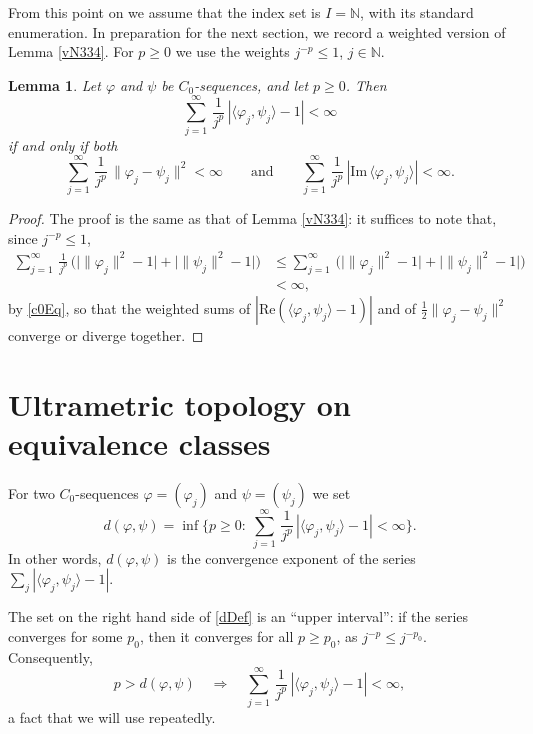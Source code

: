 \documentclass[twoside,11pt,letter]{article}
\def\bN{\mathbb{N}}
\def\im{\mathrm{Im}}
\def\re{\mathrm{Re}}
\theoremstyle{definition}
\theoremstyle{definition}
\theoremstyle{plain}
\newtheorem{lemma}[theorem]{Lemma}
\newenvironment{remark}[1][Remark.]{\begin{trivlist}
\item[\hskip \labelsep {\bfseries #1}]}{\end{trivlist}}
\begin{document}
From this point on we assume that the index set is $I=\bN$, with its standard enumeration. In preparation for the next section, we record a weighted version of Lemma \ref{vN334}. For $p\geq 0$ we use the weights $j^{-p}\leq 1$, $j\in\bN$.

\begin{lemma}\label{transferLem}
Let $\varphi$ and $\psi$ be $C_0$-sequences, and let $p\geq 0$. Then
\begin{equation*}
\sum_{j=1}^\infty\,\frac{1}{j^p}\,|\langle\varphi_j,\psi_j\rangle-1|<\infty
\end{equation*}
if and only if both
\begin{equation*}
\sum_{j=1}^\infty\,\frac{1}{j^p}\,\|\varphi_j-\psi_j\|^2<\infty
\qquad\text{and}\qquad
\sum_{j=1}^\infty\,\frac{1}{j^p}\,|\im\,\langle\varphi_j,\psi_j\rangle|<\infty.
\end{equation*}
\end{lemma}
\begin{proof}
The proof is the same as that of Lemma \ref{vN334}: it suffices to note that, since $j^{-p}\leq 1$,
\begin{equation*}
\begin{split}
\sum_{j=1}^\infty\,\frac{1}{j^p}\,\Big(\big|\|\varphi_j\|^2-1\big|+\big|\|\psi_j\|^2-1\big|\Big)
&\leq\sum_{j=1}^\infty\,\Big(\big|\|\varphi_j\|^2-1\big|+\big|\|\psi_j\|^2-1\big|\Big)\\
&<\infty,
\end{split}
\end{equation*}
by \eqref{c0Eq}, so that the weighted sums of $|\re(\langle\varphi_j,\psi_j\rangle-1)|$ and of $\frac12\|\varphi_j-\psi_j\|^2$ converge or diverge together.
\end{proof}

\section{\label{ultraSec}Ultrametric topology on equivalence classes}

For two $C_0$-sequences $\varphi=(\varphi_j)$ and $\psi=(\psi_j)$ we set
\begin{equation}\label{dDef}
d(\varphi,\psi)=\inf\Big\{p\geq 0:\:\sum _{j=1}^\infty\,\frac{1}{j^p}\,|\langle \varphi_j,\psi_j\rangle-1|<\infty\Big\}.
\end{equation}
In other words, $d(\varphi,\psi)$ is the convergence exponent of the series $\sum_j|\langle\varphi_j,\psi_j\rangle-1|$.

\begin{remark}
The set on the right hand side of \eqref{dDef} is an ``upper interval'': if the series converges for some $p_0$, then it converges for all $p\geq p_0$, as $j^{-p}\leq j^{-p_0}$. Consequently,
\begin{equation}\label{upSet}
p>d(\varphi,\psi)\quad\Longrightarrow\quad\sum _{j=1}^\infty\,\frac{1}{j^p}\,|\langle \varphi_j,\psi_j\rangle-1|<\infty,
\end{equation}
a fact that we will use repeatedly.
\end{remark}
\end{document}
